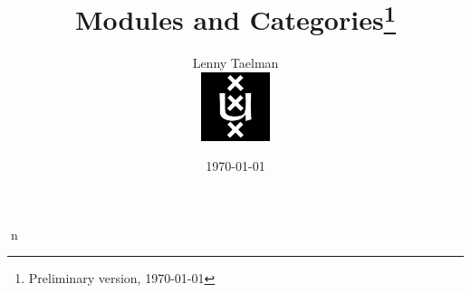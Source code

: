 \documentclass[11pt]{amsbook}
\theoremstyle{plain}
\theoremstyle{definition}
\begin{document}
\title
 {Modules and Categories\footnote{Preliminary version, \today}}


\author
 {Lenny Taelman \\\medskip\bigskip\bigskip\medskip\bigskip\bigskip\medskip\bigskip\bigskip\medskip\bigskip\bigskip\medskip\bigskip\bigskip\medskip\bigskip\bigskip\medskip\bigskip\bigskip\medskip\bigskip\bigskip\medskip\bigskip\bigskip\medskip\bigskip\bigskip\medskip\bigskip\bigskip
 \includegraphics[height=2cm]{uva}}
 
 \date
 {\today}



\maketitle


\tableofcontents



















\printindex
n
\end{document}
